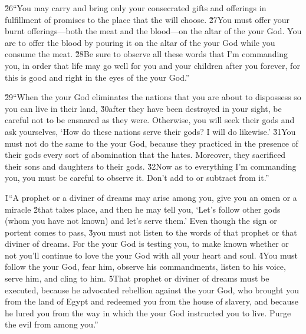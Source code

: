 \v{26}``You may carry and bring only your consecrated gifts and offerings in fulfillment of promises to the place that the  will choose. \v{27}You must offer your burnt offerings---both the meat and the blood---on the altar of the  your God. You are to offer the blood by pouring it on the altar of the  your God while you consume the meat. \v{28}Be sure to observe all these words that I'm commanding you, in order that life may go well for you and your children after you forever, for this is good and right in the eyes of the  your God.''

\v{29}``When the  your God eliminates the nations that you are about to dispossess so you can live in their land, \v{30}after they have been destroyed in your sight, be careful not to be ensnared as they were. Otherwise, you will seek their gods and ask yourselves, `How do these nations serve their gods? I will do likewise.' \v{31}You must not do the same to the  your God, because they practiced in the presence of their gods every sort of abomination that the  hates. Moreover, they sacrificed their sons and daughters to their gods. \v{32}Now as to everything I'm commanding you, you must be careful to observe it. Don't add to or subtract from it.''

\v{1}``A prophet or a diviner of dreams may arise among you, give you an omen or a miracle \v{2}that takes place, and then he may tell you, `Let's follow other gods (whom you have not known) and let's serve them.' Even though the sign or portent comes to pass, \v{3}you must not listen to the words of that prophet or that diviner of dreams. For the  your God is testing you, to make known whether or not you'll continue to love the  your God with all your heart and soul. \v{4}You must follow the  your God, fear him, observe his commandments, listen to his voice, serve him, and cling to him. \v{5}That prophet or diviner of dreams must be executed, because he advocated rebellion against the  your God, who brought you from the land of Egypt and redeemed you from the house of slavery, and because he lured you from the way in which the  your God instructed you to live. Purge the evil from among you.''

